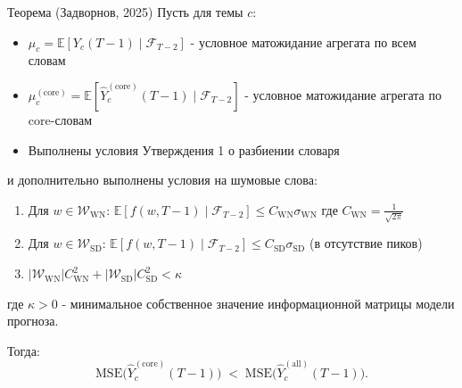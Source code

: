 \documentclass[14pt,a4paper]{article}
\begin{document}
\begin{theorem}{Теорема (Задворнов, 2025)}
Пусть для темы $c$:
\begin{itemize}
    \item $\mu_c = \mathbb{E}[Y_c(T-1) \mid \mathcal{F}_{T-2}]$ - условное матожидание агрегата по всем словам
    \item $\mu_c^{(\mathrm{core})} = \mathbb{E}[\widehat{Y}_c^{(\mathrm{core})}(T-1) \mid \mathcal{F}_{T-2}]$ - условное матожидание агрегата по core-словам
    \item Выполнены условия Утверждения 1 о разбиении словаря
\end{itemize}
и дополнительно выполнены условия на шумовые слова:
\begin{enumerate}
    \item Для $w \in \mathcal{W}_{\mathrm{WN}}$: $\mathbb{E}[f(w,T-1) \mid \mathcal{F}_{T-2}] \leq C_{\mathrm{WN}} \sigma_{\mathrm{WN}}$ где $C_{\mathrm{WN}} = \frac{1}{\sqrt{2\pi}}$
    \item Для $w \in \mathcal{W}_{\mathrm{SD}}$: $\mathbb{E}[f(w,T-1) \mid \mathcal{F}_{T-2}] \leq C_{\mathrm{SD}} \sigma_{\mathrm{SD}}$ (в отсутствие пиков)
    \item $|\mathcal{W}_{\mathrm{WN}}| C_{\mathrm{WN}}^2 + |\mathcal{W}_{\mathrm{SD}}| C_{\mathrm{SD}}^2 < \kappa$
\end{enumerate}
где $\kappa > 0$ - минимальное собственное значение информационной матрицы модели прогноза.

Тогда:
\[
  \mathrm{MSE}\bigl(\widehat{Y}_c^{(\mathrm{core})}(T-1)\bigr)
  \;<\; 
  \mathrm{MSE}\bigl(\widehat{Y}_c^{(\mathrm{all})}(T-1)\bigr).
\]
\end{theorem}
\end{document}
